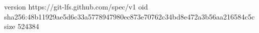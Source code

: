 version https://git-lfs.github.com/spec/v1
oid sha256:48b11929ae5d6c33a5778947980ec873e70762c34bd8e472a3b56aa216584c5c
size 524384

